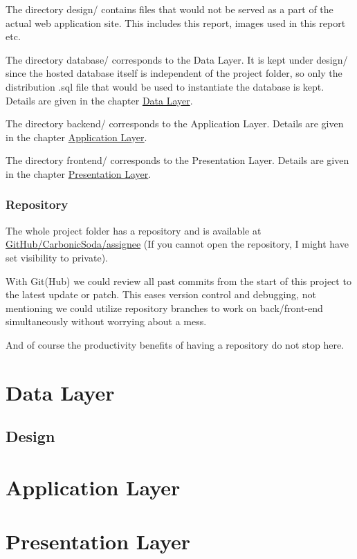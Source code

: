 \documentclass[12pt]{report}
\newcommand{\n}{\par}
\newcommand{\br}{\vspace{1 em}\n}
\begin{document}
The directory design/ contains files that would not be served as a part of the actual web application site.
This includes this report, images used in this report etc.
\br
The directory database/ corresponds to the Data Layer. It is kept under design/ since the hosted database itself is independent of the project folder, so only the distribution .sql file that would be used to instantiate the database is kept.
Details are given in the chapter \hyperref[data-layer]{Data Layer}.
\br
The directory backend/ corresponds to the Application Layer.
Details are given in the chapter \hyperref[application-layer]{Application Layer}.
\br
The directory frontend/ corresponds to the Presentation Layer.
Details are given in the chapter \hyperref[presentation-layer]{Presentation Layer}.

\subsection{Repository} \label{overview.project-structure.repository}
The whole project folder has a repository and is available at
\href{https://github.com/CarbonicSoda/assignee}{GitHub/Carbonic\-Soda/assignee}
(If you cannot open the repository, I might have set visibility to private).
\br
With Git(Hub) we could review all past commits from the start of this project to the latest update or patch.
This eases version control and debugging,
not mentioning we could utilize repository branches to work on back/front-end simultaneously without worrying about a mess.
\br
And of course the productivity benefits of having a repository do not stop here.

\chapter{Data Layer} \label{data-layer}

\section{Design}

\chapter{Application Layer} \label{application-layer}

\chapter{Presentation Layer} \label{presentation-layer}
\end{document}
